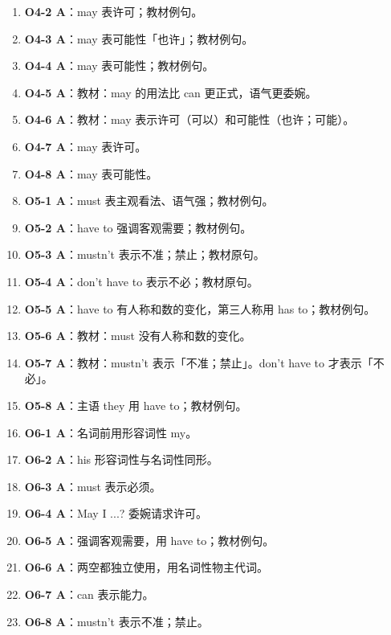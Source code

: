 \documentclass[11pt,a4paper]{ctexart}
\begin{document}
\begin{enumerate}[leftmargin=1.6em,itemsep=2pt]
\item \textbf{O4-2 A}：may 表许可；教材例句。
\item \textbf{O4-3 A}：may 表可能性「也许」；教材例句。
\item \textbf{O4-4 A}：may 表可能性；教材例句。
\item \textbf{O4-5 A}：教材：may 的用法比 can 更正式，语气更委婉。
\item \textbf{O4-6 A}：教材：may 表示许可（可以）和可能性（也许；可能）。
\item \textbf{O4-7 A}：may 表许可。
\item \textbf{O4-8 A}：may 表可能性。
\item \textbf{O5-1 A}：must 表主观看法、语气强；教材例句。
\item \textbf{O5-2 A}：have to 强调客观需要；教材例句。
\item \textbf{O5-3 A}：mustn’t 表示不准；禁止；教材原句。
\item \textbf{O5-4 A}：don’t have to 表示不必；教材原句。
\item \textbf{O5-5 A}：have to 有人称和数的变化，第三人称用 has to；教材例句。
\item \textbf{O5-6 A}：教材：must 没有人称和数的变化。
\item \textbf{O5-7 A}：教材：mustn’t 表示「不准；禁止」。don’t have to 才表示「不必」。
\item \textbf{O5-8 A}：主语 they 用 have to；教材例句。
\item \textbf{O6-1 A}：名词前用形容词性 my。
\item \textbf{O6-2 A}：his 形容词性与名词性同形。
\item \textbf{O6-3 A}：must 表示必须。
\item \textbf{O6-4 A}：May I ...? 委婉请求许可。
\item \textbf{O6-5 A}：强调客观需要，用 have to；教材例句。
\item \textbf{O6-6 A}：两空都独立使用，用名词性物主代词。
\item \textbf{O6-7 A}：can 表示能力。
\item \textbf{O6-8 A}：mustn’t 表示不准；禁止。
\end{enumerate}
\end{document}
